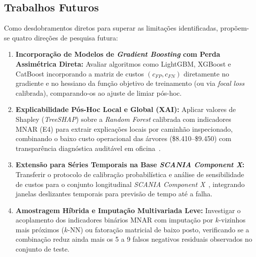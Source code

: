 \documentclass[conference]{IEEEtran}
\begin{document}
\subsection{Trabalhos Futuros}

Como desdobramentos diretos para superar as limitações identificadas, propõem-se quatro direções de pesquisa futura:
\begin{enumerate}
    \item \textbf{Incorporação de Modelos de \textit{Gradient Boosting} com Perda Assimétrica Direta:} Avaliar algoritmos como LightGBM, XGBoost e CatBoost incorporando a matriz de custos $(c_{FP}, c_{FN})$ diretamente no gradiente e no hessiano da função objetivo de treinamento (ou via \textit{focal loss} calibrada), comparando-os ao ajuste de limiar pós-hoc.
    \item \textbf{Explicabilidade Pós-Hoc Local e Global (XAI):} Aplicar valores de Shapley (\textit{TreeSHAP}) sobre a \textit{Random Forest} calibrada com indicadores MNAR (E4) para extrair explicações locais por caminhão inspecionado, combinando o baixo custo operacional das árvores (\$8.410--\$9.450) com transparência diagnóstica auditável em oficina~\cite{hughes2025xai}.
    \item \textbf{Extensão para Séries Temporais na Base \textit{SCANIA Component X}:} Transferir o protocolo de calibração probabilística e análise de sensibilidade de custos para o conjunto longitudinal \textit{SCANIA Component X}~\cite{twostage2025}, integrando janelas deslizantes temporais para previsão de tempo até a falha.
    \item \textbf{Amostragem Híbrida e Imputação Multivariada Leve:} Investigar o acoplamento dos indicadores binários MNAR com imputação por $k$-vizinhos mais próximos ($k$-NN) ou fatoração matricial de baixo posto, verificando se a combinação reduz ainda mais os 5 a 9 falsos negativos residuais observados no conjunto de teste.
\end{enumerate}
\end{document}
